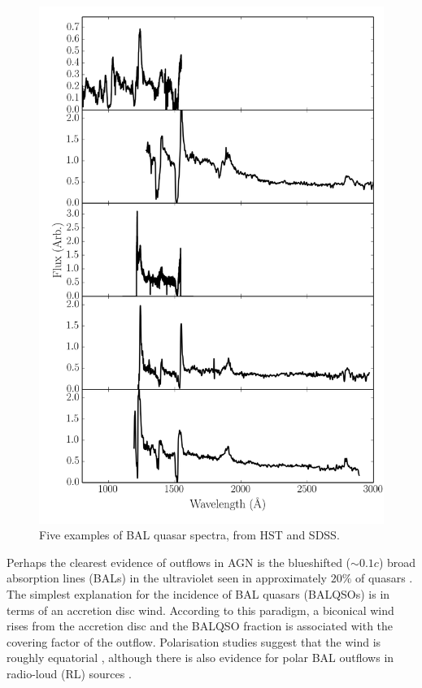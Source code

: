 \begin{figure}
\centering
\includegraphics[width=1.0\textwidth]{figures/02-outflows/bal_spectra.png}
\caption
{
Five examples of BAL quasar spectra, from HST and SDSS.
} 
\label{fig:bals}
\end{figure}

Perhaps the clearest evidence of outflows in AGN is  
the blueshifted ($\sim 0.1c$) broad absorption lines (BALs) in the 
ultraviolet seen in approximately $20\%$ of quasars
\citep{weymann1991, knigge2008, allen2011}.
The simplest explanation for the incidence of 
BAL quasars (BALQSOs) is in terms of an accretion disc wind. 
According to this paradigm, a biconical wind rises from 
the accretion disc and the BALQSO fraction is associated with
the covering factor of the outflow. 
Polarisation studies suggest that the wind is roughly equatorial
\citep{goodrich1995, cohen1995}, although there is also evidence
for polar BAL outflows  in radio-loud (RL) 
sources \citep{zhou2006,ghoshpunsly2007}.


